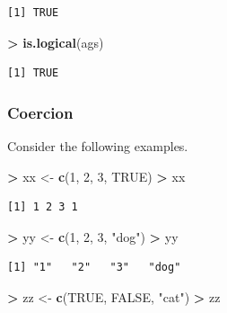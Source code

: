 \documentclass[]{krantz}
\makeatletter
\newenvironment{Shaded}{\begin{snugshade}}{\end{snugshade}}
\newcommand{\KeywordTok}[1]{\textcolor[rgb]{0.27,0.27,0.27}{\textbf{#1}}}
\newcommand{\DecValTok}[1]{\textcolor[rgb]{0.06,0.06,0.06}{#1}}
\newcommand{\StringTok}[1]{\textcolor[rgb]{0.5,0.5,0.5}{#1}}
\newcommand{\OtherTok}[1]{\textcolor[rgb]{0.37,0.37,0.37}{#1}}
\newcommand{\OperatorTok}[1]{\textcolor[rgb]{0.43,0.43,0.43}{\textbf{#1}}}
\newcommand{\NormalTok}[1]{#1}
\newenvironment{kframe}{%
\medskip{}
\setlength{\fboxsep}{.8em}
 \def\at@end@of@kframe{}%
 \ifinner\ifhmode%
  \def\at@end@of@kframe{\end{minipage}}%
  \begin{minipage}{\columnwidth}%
 \fi\fi%
 \def\FrameCommand##1{\hskip\@totalleftmargin \hskip-\fboxsep
 \colorbox{shadecolor}{##1}\hskip-\fboxsep
     \hskip-\linewidth \hskip-\@totalleftmargin \hskip\columnwidth}%
 \MakeFramed {\advance\hsize-\width
   \@totalleftmargin\z@ \linewidth\hsize
   \@setminipage}}%
 {\par\unskip\endMakeFramed%
 \at@end@of@kframe}
\renewenvironment{Shaded}{\begin{kframe}}{\end{kframe}}
\theoremstyle{definition}
\theoremstyle{definition}
\theoremstyle{definition}
\theoremstyle{remark}
\makeatother
\begin{document}
\begin{verbatim}
[1] TRUE
\end{verbatim}

\begin{Shaded}
\begin{Highlighting}[]
\OperatorTok{>}\StringTok{ }\KeywordTok{is.logical}\NormalTok{(ags)}
\end{Highlighting}
\end{Shaded}

\begin{verbatim}
[1] TRUE
\end{verbatim}

\subsubsection{Coercion}\label{coercion}

Consider the following examples.

\begin{Shaded}
\begin{Highlighting}[]
\OperatorTok{>}\StringTok{ }\NormalTok{xx <-}\StringTok{ }\KeywordTok{c}\NormalTok{(}\DecValTok{1}\NormalTok{, }\DecValTok{2}\NormalTok{, }\DecValTok{3}\NormalTok{, }\OtherTok{TRUE}\NormalTok{)}
\OperatorTok{>}\StringTok{ }\NormalTok{xx}
\end{Highlighting}
\end{Shaded}

\begin{verbatim}
[1] 1 2 3 1
\end{verbatim}

\begin{Shaded}
\begin{Highlighting}[]
\OperatorTok{>}\StringTok{ }\NormalTok{yy <-}\StringTok{ }\KeywordTok{c}\NormalTok{(}\DecValTok{1}\NormalTok{, }\DecValTok{2}\NormalTok{, }\DecValTok{3}\NormalTok{, }\StringTok{"dog"}\NormalTok{)}
\OperatorTok{>}\StringTok{ }\NormalTok{yy}
\end{Highlighting}
\end{Shaded}

\begin{verbatim}
[1] "1"   "2"   "3"   "dog"
\end{verbatim}

\begin{Shaded}
\begin{Highlighting}[]
\OperatorTok{>}\StringTok{ }\NormalTok{zz <-}\StringTok{ }\KeywordTok{c}\NormalTok{(}\OtherTok{TRUE}\NormalTok{, }\OtherTok{FALSE}\NormalTok{, }\StringTok{"cat"}\NormalTok{)}
\OperatorTok{>}\StringTok{ }\NormalTok{zz}
\end{Highlighting}
\end{Shaded}
\end{document}
